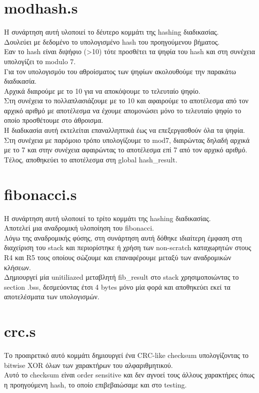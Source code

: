 \documentclass{article}
\begin{document}
\section{modhash.s}
Η συνάρτηση αυτή υλοποιεί το δέυτερο κομμάτι της hashing διαδικασίας. \\
Δουλεύει με δεδομένο το υπολογισμένο hash του προηγούμενου βήματος. \\
Εαν το hash είναι διψήφιο (>10) τότε προσθέτει τα ψηφία του hash και στη συνέχεια υπολογίζει το modulo 7. \\
Για τον υπολογισμόυ του αθροίσματος των ψηφίων ακολουθούμε την παρακάτω διαδικασία. \\
Αρχικά διαιρούμε με το 10 για να αποκόψουμε το τελευταίο ψηφίο. \\
Στη συνέχεια το πολλαπλασιάζουμε με το 10 και αφαιρούμε το αποτέλεσμα από τον αρχικό αριθμό με αποτέλεσμα να έχουμε απομονώσει μόνο το τελευταίο ψηφίο το οποίο προσθέτουμε στο άθροισμα. \\
Η διαδικασία αυτή εκτελείται επαναλληπτικά έως να επεξεργασθούν όλα τα ψηφία. \\
Στη συνέχεια με παρόμοιο τρόπο υπολογίζουμε το mod7, διαιρώντας δηλαδή αρχικά με το 7 και στην συνέχεια αφαιρώντας το αποτέλεσμα επί 7 από τον αρχικό αριθμό. \\
Τέλος, αποθηκεύει το αποτέλεσμα στη global hash\_result. \\

\section{fibonacci.s}
Η συνάρτηση αυτή υλοποιεί το τρίτο κομμάτι της hashing διαδικασίας. \\
Αποτελεί μια αναδρομική υλοποίηση του fibonacci. \\
Λόγω της αναδρομικής φύσης, στη συνάρτηση αυτή δόθηκε ιδιαίτερη έμφαση στη διαχείριση του stack και περιορίστηκε ή χρήση των non-scratch καταχωρητών στους R4 και R5 τους οποίους σώζουμε και επαναφέρουμε μεταξύ των αναδρομικών κλήσεων. \\
Δημιουργεί μία unitiliazed μεταβλητή fib\_result στο stack χρησιμοποιώντας το section .bss, δεσμεύοντας έτσι 4 bytes μόνο μία φορά και αποθηκεύει εκεί τα αποτελέσματα των υπολογισμών. \\

\section{crc.s}
Το προαιρετικό αυτό κομμάτι δημιουργεί ένα CRC-like checksum υπολογίζοντας το bitwise XOR όλων των χαρακτήρων του αλφαριθμητικού. \\
Αυτό το checksum είναι order sensitive και δεν αγνοεί τους άλλους χαρακτήρες όπως η προηγούμενη hash, το οποίο επιβεβαιώσαμε και στο testing. \\
\end{document}
